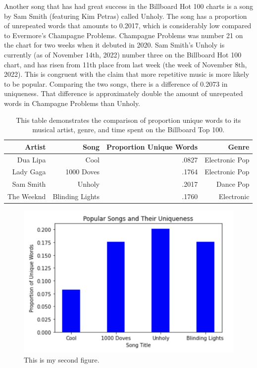 \documentclass[12pt]{article}
\begin{document}
Another song that has had great success in the Billboard Hot 100 charts is a song by Sam Smith (featuring Kim Petras) called Unholy. The song has a proportion of unrepeated words that amounts to 0.2017, which is considerably low compared to Evermore's Champagne Problems. Champagne Problems was number 21 on the chart for two weeks when it debuted in 2020. Sam Smith's Unholy is currently (as of November 14th, 2022) number three on the Billboard Hot 100 chart, and has risen from 11th place from last week (the week of November 8th, 2022). This is congruent with the claim that more repetitive music is more likely to be popular. Comparing the two songs, there is a difference of 0.2073 in uniqueness. That difference is approximately double the amount of unrepeated words in Champagne Problems than Unholy. 



\begin{table}[tbp]
  \caption{This table demonstrates the comparison of proportion unique words to its musical artist, genre, and time spent on the Billboard Top 100.}
  \label{tab:rv}
\centering
\begin{tabular}{rrrr}
  \toprule
Artist & Song & Proportion Unique Words & Genre \\ 
  \midrule
Dua Lipa & Cool & .0827 & Electronic Pop \\ 
  Lady Gaga & 1000 Doves  & .1764 & Electronic Pop \\ 
  Sam Smith & Unholy & .2017 & Dance Pop \\ 
  The Weeknd & Blinding Lights & .1760 & Electronic \\ 
     \bottomrule
\end{tabular}
\end{table}

\begin{figure}[htbp]
  \centering
  \includegraphics[width=\textwidth]{graph 2.png}
  \caption{This is my second figure.}
  \label{fig:graph 2}
\end{figure}
\end{document}

